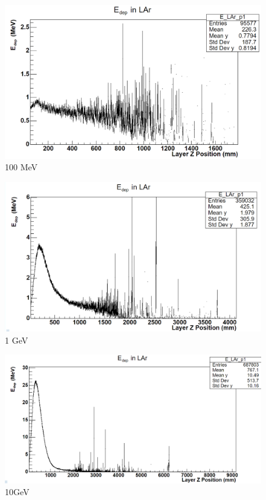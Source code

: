 \documentclass[%
 reprint,
 amsmath,amssymb,
 aps,
]{revtex4-2}
\begin{document}
\begin{figure}[H]
    \centering
    \includegraphics[width=0.9\columnwidth]{profile_0.95_10_100.png}%
    \caption{\label{fig:epsart} 100 MeV }
\end{figure}

\begin{figure}[H]
    \centering
    \includegraphics[width=0.9\columnwidth]{profile_0.95_10_1000.png}%
    \caption{\label{fig:epsart} 1 GeV }
\end{figure}

\begin{figure}[H]
    \centering
    \includegraphics[width=0.9\columnwidth]{profile_0.95_10_10000.png}%
    \caption{\label{fig:epsart} 10GeV }
\end{figure}
\end{document}
